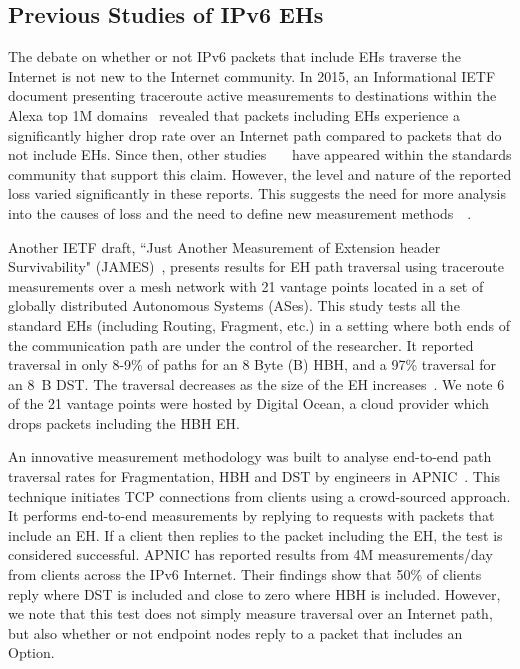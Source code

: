 \documentclass[conference]{IEEEtran}
\begin{document}
\subsection{Previous Studies of IPv6 EHs}

\label{sec:motivation}

The debate on whether or not IPv6 packets that include EHs traverse the Internet is not new to the Internet community.
In 2015, an Informational IETF document presenting traceroute active
measurements to destinations within the Alexa top 1M domains~\cite{RFC7872}
revealed that packets including EHs experience a significantly higher drop rate over an
Internet path compared to packets that do not include EHs. Since then, other
studies~\cite{james}~\cite{nalini-iepg114}~\cite{apnic} have appeared within the standards community that support this claim.  However,
the level and nature of the reported loss varied significantly in these
reports.  This suggests the need for more analysis into the causes of loss and the need to define new measurement methods~\cite{james}~\cite{elkins-v6ops-eh-deepdive-fw-01}.  


Another IETF draft, ``Just Another Measurement of Extension header
Survivability" (JAMES)~\cite{james}, presents results for EH path traversal using
traceroute measurements over a mesh network with 21 vantage points located in a set of globally distributed Autonomous Systems (ASes). This study tests all the standard EHs
(including Routing, Fragment, etc.) in a setting where both ends of the
communication path are under the control of the researcher.  It reported traversal in only 8-9\% of paths for an 8 Byte (B) HBH, and a 97\% traversal for an 8~B DST. The traversal decreases as the size of the EH
increases~\cite{james-imc}. We note 6 of the 21 vantage points were
hosted by Digital Ocean\texttrademark, a cloud provider which drops packets including the HBH EH.

An innovative measurement methodology was built to analyse end-to-end path traversal
rates for Fragmentation, HBH and DST by engineers in APNIC~\cite{apnic}.  This technique initiates TCP connections from clients using a crowd-sourced approach. It performs  end-to-end measurements by replying to requests with packets that include an EH. If a client then replies to the packet including the EH, the test is considered successful.  
APNIC has reported results from 4M measurements/day from clients across the IPv6 Internet.  Their findings show that 50\%  of clients reply where DST is included and close to zero where HBH is included.
However, we note that this test does not simply measure traversal over an Internet path, but also whether or not endpoint nodes reply to a packet that includes an Option. 
\end{document}
